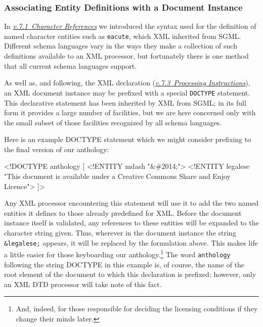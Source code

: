 \subsubsection[{Associating Entity Definitions with a Document Instance}]{Associating Entity Definitions with a Document Instance}\label{SG-ass1}\par
In \textit{\hyperref[SG-er]{v.7.1\ Character References}} we introduced the syntax used for the definition of named character entities such as \texttt{eacute}, which XML inherited from SGML. Different schema languages vary in the ways they make a collection of such definitions available to an XML processor, but fortunately there is one method that all current schema languages support.\par
As well as, and following, the XML declaration (\textit{\hyperref[SG-pi]{v.7.3\ Processing Instructions}}), an XML document instance may be prefixed with a special \texttt{DOCTYPE} statement. This declarative statement has been inherited by XML from SGML; in its full form it provides a large number of facilities, but we are here concerned only with the small subset of those facilities recognized by all schema languages.\par
Here is an example DOCTYPE statement which we might consider prefixing to the final version of our anthology: \par\hfill\bgroup\exampleFont\vskip 10pt\begin{shaded}
\obeyspaces <!DOCTYPE anthology [\newline
<!ENTITY mdash "\&\#2014;">\newline
<!ENTITY legalese "This document is available under a Creative Commons\newline
Share and Enjoy Licence">\newline
]>\end{shaded}
\par\egroup 
 Any XML processor encountering this statement will use it to add the two named entities it defines to those already predefined for XML. Before the document instance itself is validated, any references to these entities will be expanded to the character string given. Thus, wherever in the document instance the string \texttt{\&legalese;} appears, it will be replaced by the formulation above. This makes life a little easier for those keyboarding our anthology.\footnote{And, indeed, for those responsible for deciding the licensing conditions if they change their minds later.} The word \texttt{anthology} following the string DOCTYPE in this example is, of course, the name of the root element of the document to which this declaration is prefixed; however, only an XML DTD processor will take note of this fact.
